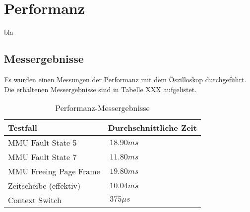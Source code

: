 \section{Performanz}
bla

\subsection{Messergebnisse}
Es wurden einen Messungen der Performanz mit dem Oszilloskop durchgeführt. Die erhaltenen Messergebnisse sind in Tabelle XXX aufgelistet.

\begin{table}[H]
\begin{tabular}{p{7cm} | p{7cm}}
  \textbf{Testfall} & \textbf{Durchschnittliche Zeit} \\ \hline
  	MMU Fault State 5 & $~18.90 ms$ \\
  	MMU Fault State 7 & $~11.80 ms$ \\
  	MMU Freeing Page Frame & $~19.80 ms$ \\
  	Zeitscheibe (effektiv) & $~10.04 ms$ \\
  	Context Switch & $~375 \mu s$ \\
 \end{tabular}
 \caption{Performanz-Messergebnisse}
 \label{table:SpecifiedVirtualMemory}
\end{table}

\pagebreak 